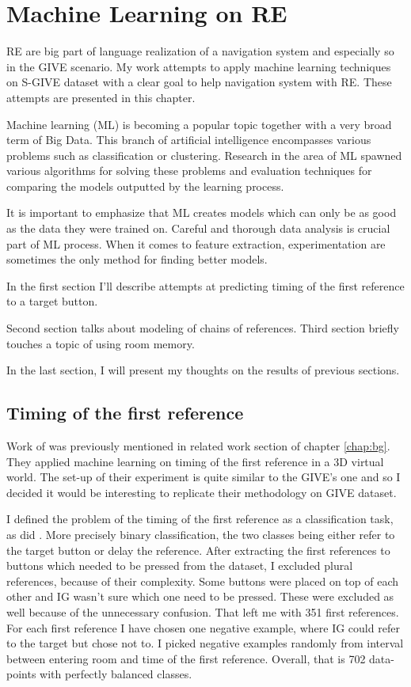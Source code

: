 \chapter{Machine Learning on RE}
\label{chap:ml}
RE are big part of language realization of a navigation system and especially so in the GIVE scenario. My work attempts to apply machine learning techniques on S-GIVE dataset with a clear goal to help navigation system with RE. These attempts are presented in this chapter.

Machine learning (ML) is becoming a popular topic together with a very broad term of Big Data. This branch of artificial intelligence encompasses various problems such as classification or clustering. Research in the area of ML spawned various algorithms for solving these problems and evaluation techniques for comparing the models outputted by the learning process. 

It is important to emphasize that ML creates models which can only be as good as the data they were trained on. Careful and thorough data analysis is crucial part of ML process. When it comes to feature extraction, experimentation are sometimes the only method for finding better models. 

In the first section I'll describe attempts at predicting timing of the first reference to a target button. 

Second section talks about modeling of chains of references. 
Third section briefly touches a topic of using room memory. 

In the last section, I will present my thoughts on the results of previous sections.

\section{Timing of the first reference}
\label{sec:timing-firsref-ml}
Work of \citet{stoia2006sentence} was previously mentioned in related work section of chapter \ref{chap:bg}. They applied machine learning on timing of the first reference in a 3D virtual world. The set-up of their experiment is quite similar to the GIVE's one and so I decided it would be interesting to replicate their methodology on GIVE dataset. 

I defined the problem of the timing of the first reference as a classification task, as did \citet{stoia2006sentence}. More precisely binary classification, the two classes being either refer to the target button or delay the reference. After extracting the first references to buttons which needed to be pressed from the dataset, I excluded plural references, because of their complexity. Some buttons were placed on top of each other and IG wasn't sure which one need to be pressed. These were excluded as well because of the unnecessary confusion. That left me with 351 first references. For each first reference I have chosen one negative example, where IG could refer to the target but chose not to. I picked negative examples randomly from interval between entering room and time of the first reference. Overall, that is 702 data-points with perfectly balanced classes.


